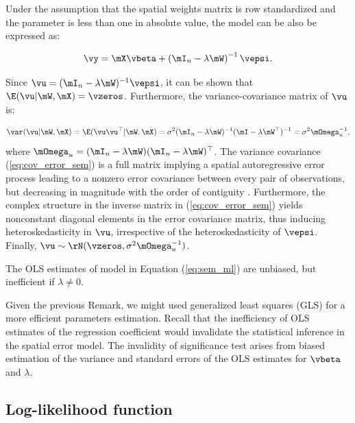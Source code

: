 \documentclass[english,12pt]{book}\usepackage[]{graphicx}\usepackage[]{xcolor}
\begin{document}
Under the assumption that the spatial weights matrix is row standardized and the parameter is less than one in absolute value, the model can be also be expressed as:

\begin{equation*}
	\vy = \mX\vbeta + \left(\mI_n-\lambda\mW\right)^{-1}\vepsi.
\end{equation*}

Since $\vu = (\mI_n - \lambda\mW)^{-1}\vepsi$, it can be shown that $\E(\vu| \mW, \mX) = \vzeros$. Furthermore, the variance-covariance matrix of $\vu$ is: 

\begin{equation}\label{eq:cov_error_sem}
\var(\vu| \mW, \mX)=\E(\vu\vu^\top| \mW, \mX) = \sigma^2(\mI_n-\lambda\mW)^{-1}(\mI-\lambda\mW^\top)^{-1}=\sigma^2\mOmega_{u}^{-1},
\end{equation}
%
where $\mOmega_{u}=(\mI_n-\lambda\mW)(\mI_n-\lambda\mW)^\top$. The variance covariance (\ref{eq:cov_error_sem}) is a full matrix implying a spatial autoregressive error process leading to a nonzero error covariance between every pair of observations, but decreasing in magnitude with the order of contiguity \citep{AnselinBera1998}. Furthermore, the complex structure in the inverse matrix in (\ref{eq:cov_error_sem}) yields nonconstant diagonal elements in the error covariance matrix, thus inducing heteroskedasticity in $\vu$, irrespective of the heteroskedasticity of $\vepsi$. Finally, $\vu \sim \rN(\vzeros, \sigma^2\mOmega_u^{-1})$.


\begin{remark}\label{remark:ols_sem}
  The OLS estimates of model in Equation (\ref{eq:sem_ml}) are unbiased, but inefficient if $\lambda \neq 0$.
\end{remark}

Given the previous Remark, we might used generalized least squares (GLS) for a more efficient parameters estimation. Recall that the inefficiency of OLS estimates of the regression coefficient would invalidate the statistical inference in the spatial error model. The invalidity of significance test arises from biased estimation of the variance and standard errors of the OLS estimates for $\vbeta$ and $\lambda$.

\subsection{Log-likelihood function}
\end{document}
